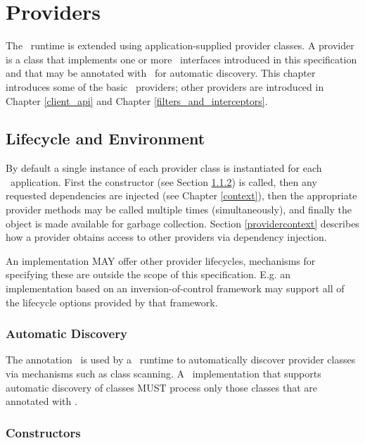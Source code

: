 \chapter{Providers}
\label{providers}

The \jaxrs\ runtime is extended using application-supplied provider classes. A provider is a class that implements one or more \jaxrs\ interfaces introduced in this specification and that may be annotated with \Provider\ for automatic discovery. This chapter introduces some of the basic \jaxrs\ providers; other providers are introduced in Chapter \ref{client_api} and Chapter \ref{filters_and_interceptors}.

\section{Lifecycle and Environment}
\label{lifecycle_and_environment}

By default a single instance of each provider class is instantiated for each \jaxrs\ application. First the constructor (see Section \ref{provider_class_constructor}) is called, then any requested dependencies are injected (see Chapter \ref{context}), then the appropriate provider methods may be called multiple times (simultaneously), and finally the object is made available for garbage collection. Section \ref{providercontext} describes how a provider obtains access to other providers via dependency injection.

An implementation MAY offer other provider lifecycles, mechanisms for specifying these are outside the scope of this specification. E.g. an implementation based on an inversion-of-control framework may support all of the lifecycle options provided by that framework.

\subsection{Automatic Discovery}
\label{automatic_discovery}

The annotation \Provider\ is used by a \jaxrs\ runtime to automatically discover provider classes via mechanisms such as class scanning. A \jaxrs\ implementation that supports automatic discovery of classes MUST process only those classes that are annotated with \Provider.

\subsection{Constructors}
\label{provider_class_constructor}

